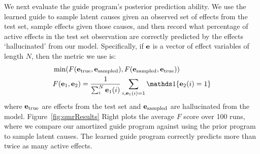 We next evaluate the guide program's posterior prediction ability. We use the learned guide to sample latent causes given an observed set of effects from the test set, sample effects given those causes, and then record what percentage of active effects in the test set observation are correctly predicted by the effects `hallucinated' from our model. Specifically, if $\mathbf{e}$ is a vector of effect variables of length $N$, then the metric we use is:
\begin{align*}
&\min(F(\vecstyle{e}_{\text{true}}, \vecstyle{e}_{\text{sampled}}), F(\vecstyle{e}_{\text{sampled}}, \vecstyle{e}_{\text{true}}))\\
&F(\vecstyle{e}_1, \vecstyle{e}_2) = \frac{1}{\sum_i^N \vecstyle{e}_1(i)} \sum_{i, \vecstyle{e}_1(i) = 1} \indicator{\vecstyle{e}_2(i) = 1}
\end{align*}
where $\mathbf{e}_{\text{true}}$ are effects from the test set and $\mathbf{e}_{\text{sampled}}$ are hallucinated from the model.
Figure~\ref{fig:qmrResults} Right plots the average $F$ score over 100 runs, where we compare our amortized guide program against using the prior program to sample latent causes. The learned guide program correctly predicts more than twice as many active effects.

